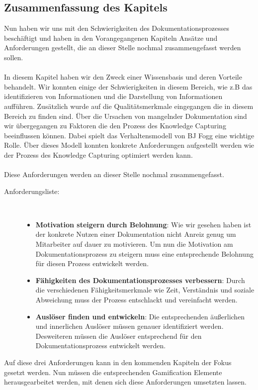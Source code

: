 \documentclass[a4paper,12pt]{scrartcl}
\begin{document}
\subsection{Zusammenfassung des Kapitels}
Nun haben wir uns mit den Schwierigkeiten des Dokumentationsprozesses beschäftigt und haben in den Vorangegangenen Kapiteln Ansätze und Anforderungen gestellt, die an dieser Stelle nochmal zusammengefasst werden sollen.
\\\\
In diesem Kapitel haben wir den Zweck einer Wissensbasis und deren Vorteile behandelt. Wir konnten einige der Schwierigkeiten in diesem Bereich, wie z.B das identifizieren von Informationen und die Darstellung von Informationen aufführen. Zusätzlich wurde auf die Qualitätsmerkmale eingegangen die in diesem Bereich zu finden sind. Über die Ursachen von mangelnder Dokumentation sind wir übergegangen zu Faktoren die den Prozess des Knowledge Capturing beeinflussen können. Dabei spielt das Verhaltensmodell von BJ Fogg eine wichtige Rolle. Über dieses Modell konnten konkrete Anforderungen aufgestellt werden wie der Prozess des Knowledge Capturing optimiert werden kann.
\\\\
Diese Anforderungen werden an dieser Stelle nochmal zusammengefasst.
\begin{description}
   \item[Anforderungsliste:]~\par
   \begin{itemize}
      \item \textbf{Motivation steigern durch Belohnung}: Wie wir gesehen haben ist der konkrete Nutzen einer Dokumentation nicht Anreiz genug um Mitarbeiter auf dauer zu motivieren. Um nun die Motivation am Dokumentationsprozess zu steigern muss eine entsprechende Belohnung für diesen Prozess entwickelt werden.
      \item \textbf{Fähigkeiten des Dokumentationsprozesses verbessern}: Durch die verschiedenen Fähigkeitsmerkmale wie Zeit, Verständnis und soziale Abweichung muss der Prozess entschlackt und vereinfacht werden.
      \item \textbf{Auslöser finden und entwickeln}: Die entsprechenden äußerlichen und innerlichen Auslöser müssen genauer identifiziert werden. Desweiteren müssen die Auslöser entsprechend für den Dokumentationsprozess entwickelt werden.
   \end{itemize}
\end{description}
Auf diese drei Anforderungen kann in den kommenden Kapiteln der Fokus gesetzt werden. Nun müssen die entsprechenden Gamification Elemente herausgearbeitet werden, mit denen sich diese Anforderungen umsetzten lassen.    
\end{document}
